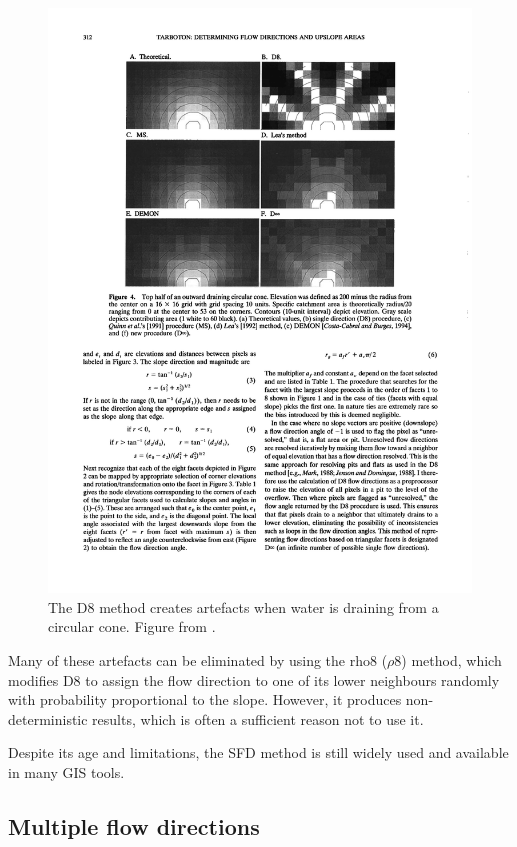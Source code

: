 \begin{figure}[htbp]
\centering
\includegraphics[width=0.95\linewidth]{figs/d8.pdf}
\caption{The D8 method creates artefacts when water is draining from a circular cone. Figure from \citet{Tarborton97}.}%
\label{fig:d8}
\end{figure}

Many of these artefacts can be eliminated by using the rho8 (\(\rho8\)) method, which modifies D8 to assign the flow direction to one of its lower neighbours randomly with probability proportional to the slope.
However, it produces non-deterministic results, which is often a sufficient reason not to use it.

Despite its age and limitations, the SFD method is still widely used and available in many GIS tools\@.

\subsection{Multiple flow directions}


